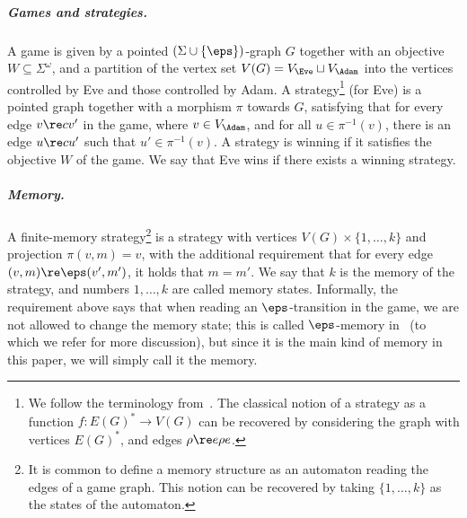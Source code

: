 \subparagraph*{Games and strategies.}
A game is given by a pointed $(\Sigma \cup \{\eps\})$-graph $G$ together with an objective $W \subseteq \Sigma^\omega$, and a partition of the vertex set $V(G)=V_\Eve \sqcup V_\Adam$ into the vertices controlled by Eve and those controlled by Adam.
A strategy\footnote{We follow the terminology from~\cite{CO25LMCS}. The classical notion of a strategy as a function $f\colon E(G)^*\to V(G)$ can be recovered by considering the graph with vertices $E(G)^*$, and edges $\rho \re e \rho e$.} (for Eve) is a pointed graph together with a morphism $\pi$ towards $G$, %
satisfying that for every edge $v \re c v'$ in the game, where $v \in V_\Adam$, and for all $u \in \pi^{-1}(v)$, there is an edge $u \re c u'$ such that $u' \in \pi^{-1}(v)$.
A strategy is winning if it satisfies the objective $W$ of the game.
We say that Eve wins if there exists a winning strategy.



\subparagraph{Memory.} 
A finite-memory strategy\footnote{It is common to define a memory structure as an automaton reading the edges of a game graph. This notion can be recovered by taking $\{1,\dots,k\}$ as the states of the automaton.}
is a strategy with vertices $V(G) \times \{1,\dots,k\}$ and projection $\pi(v,m)=v$, with the additional requirement that for every edge $(v,m) \re \eps (v',m')$, it holds that $m=m'$.
We say that $k$ is the memory of the strategy, and numbers $1,\dots,k$ are called memory states.
Informally, the requirement above says that when reading an $\eps$-transition in the game, we are not allowed to change the memory state; this is called $\eps$-memory in~\cite{CO25LMCS} (to which we refer for more discussion), but since it is the main kind of memory in this paper, we will simply call it the memory.

